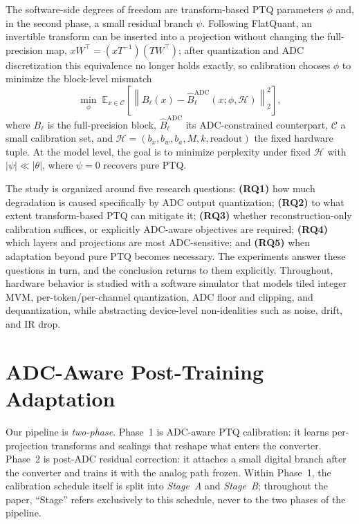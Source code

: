 \documentclass[letterpaper]{article} %
\theoremstyle{plain}
\begin{document}
The software-side degrees of freedom are transform-based PTQ parameters $\phi$ and, in the second phase, a small residual branch $\psi$. Following FlatQuant, an invertible transform can be inserted into a projection without changing the full-precision map, $xW^{\top} = (xT^{-1})(TW^{\top})$; after quantization and ADC discretization this equivalence no longer holds exactly, so calibration chooses $\phi$ to minimize the block-level mismatch
\begin{equation}
    \min_{\phi}\;
    \mathbb{E}_{x \in \mathcal{C}}
    \left[\left\| B_\ell(x) - \hat{B}^{\mathrm{ADC}}_\ell(x;\phi,\mathcal{H}) \right\|_2^2\right],
    \label{eq:calib}
\end{equation}
where $B_\ell$ is the full-precision block, $\hat{B}^{\mathrm{ADC}}_\ell$ its ADC-constrained counterpart, $\mathcal{C}$ a small calibration set, and $\mathcal{H} = (b_x, b_w, b_a, M, k, \mathrm{readout})$ the fixed hardware tuple. At the model level, the goal is to minimize perplexity under fixed $\mathcal{H}$ with $|\psi| \ll |\theta|$, where $\psi = 0$ recovers pure PTQ.

The study is organized around five research questions: \textbf{(RQ1)} how much degradation is caused specifically by ADC output quantization; \textbf{(RQ2)} to what extent transform-based PTQ can mitigate it; \textbf{(RQ3)} whether reconstruction-only calibration suffices, or explicitly ADC-aware objectives are required; \textbf{(RQ4)} which layers and projections are most ADC-sensitive; and \textbf{(RQ5)} when adaptation beyond pure PTQ becomes necessary. The experiments answer these questions in turn, and the conclusion returns to them explicitly. Throughout, hardware behavior is studied with a software simulator that models tiled integer MVM, per-token/per-channel quantization, ADC floor and clipping, and dequantization, while abstracting device-level non-idealities such as noise, drift, and IR drop.

\section{ADC-Aware Post-Training Adaptation}

Our pipeline is \emph{two-phase}. Phase~1 is ADC-aware PTQ calibration: it learns per-projection transforms and scalings that reshape what enters the converter. Phase~2 is post-ADC residual correction: it attaches a small digital branch after the converter and trains it with the analog path frozen. Within Phase~1, the calibration schedule itself is split into \emph{Stage~A} and \emph{Stage~B}; throughout the paper, ``Stage'' refers exclusively to this schedule, never to the two phases of the pipeline.
\end{document}
